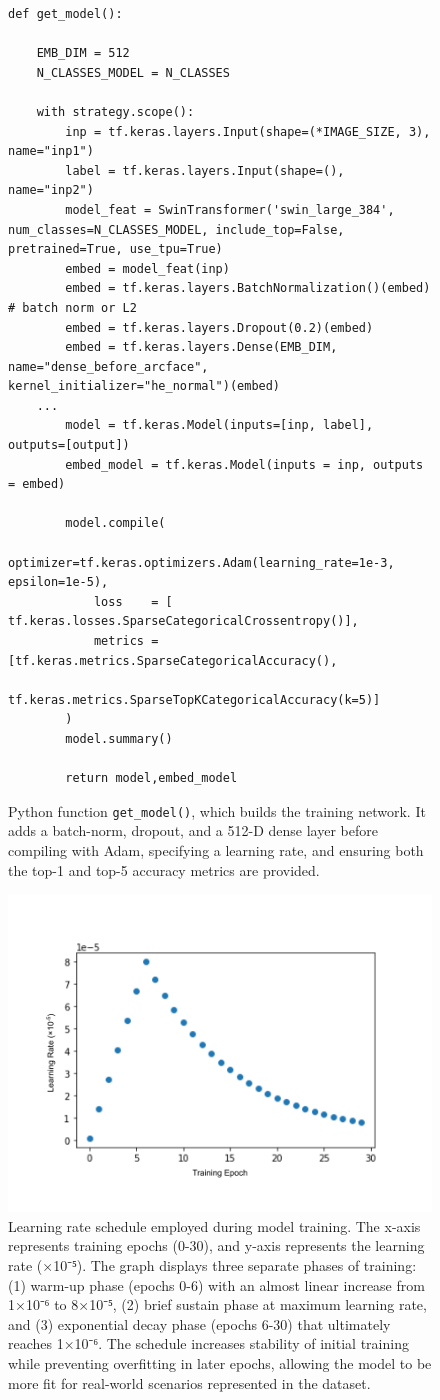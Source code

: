 \documentclass[twocolumn]{article}
\begin{document}
\begin{figure}[H]
\begin{minipage}{1.05\linewidth}
\begin{lstlisting}
def get_model():

    EMB_DIM = 512
    N_CLASSES_MODEL = N_CLASSES

    with strategy.scope():
        inp = tf.keras.layers.Input(shape=(*IMAGE_SIZE, 3), name="inp1")
        label = tf.keras.layers.Input(shape=(), name="inp2")
        model_feat = SwinTransformer('swin_large_384', num_classes=N_CLASSES_MODEL, include_top=False, pretrained=True, use_tpu=True)
        embed = model_feat(inp)
        embed = tf.keras.layers.BatchNormalization()(embed) # batch norm or L2
        embed = tf.keras.layers.Dropout(0.2)(embed)
        embed = tf.keras.layers.Dense(EMB_DIM, name="dense_before_arcface", kernel_initializer="he_normal")(embed)
    ...
        model = tf.keras.Model(inputs=[inp, label], outputs=[output])
        embed_model = tf.keras.Model(inputs = inp, outputs = embed)

        model.compile(
            optimizer=tf.keras.optimizers.Adam(learning_rate=1e-3, epsilon=1e-5),
            loss    = [ tf.keras.losses.SparseCategoricalCrossentropy()],
            metrics = [tf.keras.metrics.SparseCategoricalAccuracy(),
                       tf.keras.metrics.SparseTopKCategoricalAccuracy(k=5)]
        )
        model.summary()
        
        return model,embed_model
\end{lstlisting}
\end{minipage}
\caption{Python function \texttt{get_model()}, which builds the training network. It adds a batch-norm, dropout, and a 512-D dense layer before compiling with Adam, specifying a learning rate, and ensuring both the top-1 and top-5 accuracy metrics are provided.}
\end{figure}

\begin{figure}[H]
    \centering
    \includegraphics[width=0.5\linewidth]{learning.png}
    \caption{Learning rate schedule employed during model training. The x-axis represents training epochs (0-30), and y-axis represents the learning rate (×10⁻⁵). The graph displays three separate phases of training: (1) warm-up phase (epochs 0-6) with an almost linear increase from 1×10⁻⁶ to 8×10⁻⁵, (2) brief sustain phase at maximum learning rate, and (3) exponential decay phase (epochs 6-30) that ultimately reaches 1×10⁻⁶. The schedule increases stability of initial training while preventing overfitting in later epochs, allowing the model to be more fit for real-world scenarios represented in the dataset.}
\end{figure}
\end{document}
